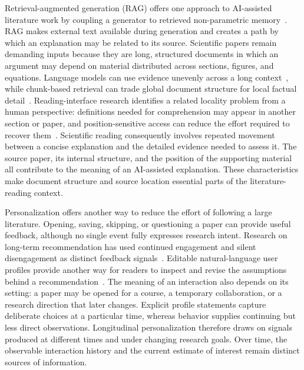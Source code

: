 Retrieval-augmented generation (RAG) offers one approach to AI-assisted literature work by coupling a generator to retrieved non-parametric memory~\cite{lewis2020rag}.
RAG makes external text available during generation and creates a path by which an explanation may be related to its source.
Scientific papers remain demanding inputs because they are long, structured documents in which an argument may depend on material distributed across sections, figures, and equations.
Language models can use evidence unevenly across a long context~\cite{liu2024lost}, while chunk-based retrieval can trade global document structure for local factual detail~\cite{zhao2024longrag}.
Reading-interface research identifies a related locality problem from a human perspective: definitions needed for comprehension may appear in another section or paper, and position-sensitive access can reduce the effort required to recover them~\cite{head2021scholarphi}.
Scientific reading consequently involves repeated movement between a concise explanation and the detailed evidence needed to assess it.
The source paper, its internal structure, and the position of the supporting material all contribute to the meaning of an AI-assisted explanation.
These characteristics make document structure and source location essential parts of the literature-reading context.

Personalization offers another way to reduce the effort of following a large literature.
Opening, saving, skipping, or questioning a paper can provide useful feedback, although no single event fully expresses research intent.
Research on long-term recommendation has used continued engagement and silent disengagement as distinct feedback signals~\cite{zhang2025unpaired}.
Editable natural-language user profiles provide another way for readers to inspect and revise the assumptions behind a recommendation~\cite{ramos2024scrutable}.
The meaning of an interaction also depends on its setting: a paper may be opened for a course, a temporary collaboration, or a research direction that later changes.
Explicit profile statements capture deliberate choices at a particular time, whereas behavior supplies continuing but less direct observations.
Longitudinal personalization therefore draws on signals produced at different times and under changing research goals.
Over time, the observable interaction history and the current estimate of interest remain distinct sources of information.

